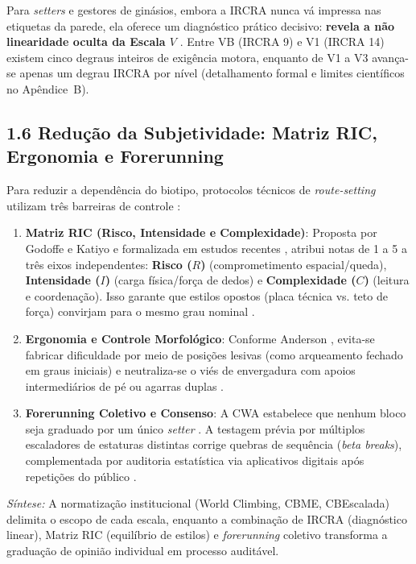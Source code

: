 Para \textit{setters} e gestores de ginásios, embora a IRCRA nunca vá impressa nas etiquetas da parede, ela oferece um diagnóstico prático decisivo: \textbf{revela a não linearidade oculta da Escala $V$} \cite{ircra_draper, youthclimbing_conv}. Entre VB (IRCRA 9) e V1 (IRCRA 14) existem cinco degraus inteiros de exigência motora, enquanto de V1 a V3 avança-se apenas um degrau IRCRA por nível (detalhamento formal e limites científicos no Apêndice~B).

\subsection*{1.6 Redução da Subjetividade: Matriz RIC, Ergonomia e Forerunning}

Para reduzir a dependência do biotipo, protocolos técnicos de \textit{route-setting} utilizam três barreiras de controle \cite{cwa_setting, anderson_routesetting, pmc_ric_study}:
\begin{enumerate}
    \item \textbf{Matriz RIC (Risco, Intensidade e Complexidade)}: Proposta por Godoffe e Katiyo e formalizada em estudos recentes \cite{godoffe_routesetting, pmc_ric_study}, atribui notas de 1 a 5 a três eixos independentes: \textbf{Risco ($R$)} (comprometimento espacial/queda), \textbf{Intensidade ($I$)} (carga física/força de dedos) e \textbf{Complexidade ($C$)} (leitura e coordenação). Isso garante que estilos opostos (placa técnica vs. teto de força) convirjam para o mesmo grau nominal \cite{agility_ric}.
    \item \textbf{Ergonomia e Controle Morfológico}: Conforme Anderson \cite{anderson_routesetting}, evita-se fabricar dificuldade por meio de posições lesivas (como arqueamento fechado em graus iniciais) e neutraliza-se o viés de envergadura com apoios intermediários de pé ou agarras duplas \cite{paraclimbing_guide}.
    \item \textbf{Forerunning Coletivo e Consenso}: A CWA estabelece que nenhum bloco seja graduado por um único \textit{setter} \cite{cwa_setting}. A testagem prévia por múltiplos escaladores de estaturas distintas corrige quebras de sequência (\textit{beta breaks}), complementada por auditoria estatística via aplicativos digitais após repetições do público \cite{rockrealms_home, topclimbing_platform}.
\end{enumerate}

\noindent\textit{Síntese:} A normatização institucional (World Climbing, CBME, CBEscalada) delimita o escopo de cada escala, enquanto a combinação de IRCRA (diagnóstico linear), Matriz RIC (equilíbrio de estilos) e \textit{forerunning} coletivo transforma a graduação de opinião individual em processo auditável.
